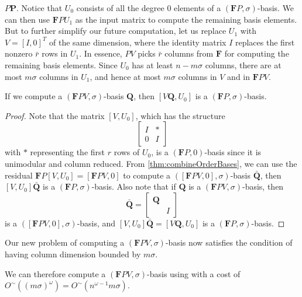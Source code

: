 $P\mathbf{P}$. Notice that $U_{0}$ consists of all the degree 0
elements of a $\left(\mathbf{F}P,\sigma\right)$-basis. We can then
use $\mathbf{F}PU_{1}$ as the input matrix to compute the remaining
basis elements. But to further simplify our future computation, let
us replace $U_{1}$ with $V=\left[I,0\right]^{T}$ of the same dimension,
where the identity matrix $I$ replaces the first nonzero $\bar{r}$
rows in $U_{1}$. In essence, $PV$ picks $\bar{r}$ columns from
$\mathbf{F}$ for computing the remaining basis elements. Since $U_{0}$
has at least $n-m\sigma$ columns, there are at most $m\sigma$ columns
in $U_{1}$, and hence at most $m\sigma$ columns in $V$ and in $\mathbf{F}PV$. 
\begin{lem}
\begin{comment}
Let If $\bar{F}P\left[U_{2},U_{0}\right]$ is in the reduced column
echelon form of $\bar{F}$ with $U_{0}$ being a nullspace basis of
$\bar{F}P$, and i
\end{comment}
If we compute a $\left(\mathbf{F}PV,\sigma\right)$-basis $\mathbf{Q}$,
then $\left[V\mathbf{Q},U_{0}\right]$ is a $\left(\mathbf{F}P,\sigma\right)$-basis.\end{lem}
\begin{proof}
Note that the matrix $\left[V,U_{0}\right]$, which has the structure
\[
\begin{bmatrix}I & *\\
0 & I
\end{bmatrix}
\]
 with $*$ representing the first $r$ rows of $U_{0}$, is a $\left(\mathbf{F}P,0\right)$-basis
since it is unimodular and column reduced. From \ref{thm:combineOrderBases},
we can use the residual $\mathbf{F}P[V,U_{0}]=\left[\mathbf{F}PV,0\right]$
to compute a $\left(\left[\mathbf{F}PV,0\right],\sigma\right)$-basis
$\bar{\mathbf{Q}}$, then $[V,U_{0}]\bar{\mathbf{Q}}$ is a $\left(\mathbf{F}P,\sigma\right)$-basis.
Also note that if $\mathbf{Q}$ is a $\left(\mathbf{F}PV,\sigma\right)$-basis,
then 
\[
\bar{\mathbf{Q}}=\begin{bmatrix}\mathbf{Q}\\
 & I
\end{bmatrix}
\]
 is a $\left(\left[\mathbf{F}PV,0\right],\sigma\right)$-basis, and
$[V,U_{0}]\bar{\mathbf{Q}}=\left[V\mathbf{Q},U_{0}\right]$ is a $\left(\mathbf{F}P,\sigma\right)$-basis.
\end{proof}
Our new problem of computing a $\left(\mathbf{F}PV,\sigma\right)$-basis
now satisfies the condition of having column dimension bounded by
$m\sigma$.%
\begin{comment}
\begin{lem}
The column dimensions of $V$ and $\mathbf{F}PV$ are bounded by $m\sigma$.\end{lem}
\begin{proof}
The rank of $\bar{F}$ is bounded by $m\sigma$. This means its nullspace
basis $U_{0}$ has at least $n-m\sigma$ columns. Therefore $V$ has
at most $m\sigma$ columns.\end{proof}
\end{comment}
{} We can therefore compute a $\left(\mathbf{F}PV,\sigma\right)$-basis
using  with a cost of $O^{\sim}\left(\left(m\sigma\right)^{\omega}\right)=O^{\sim}\left(n^{\omega-1}m\sigma\right)$.

